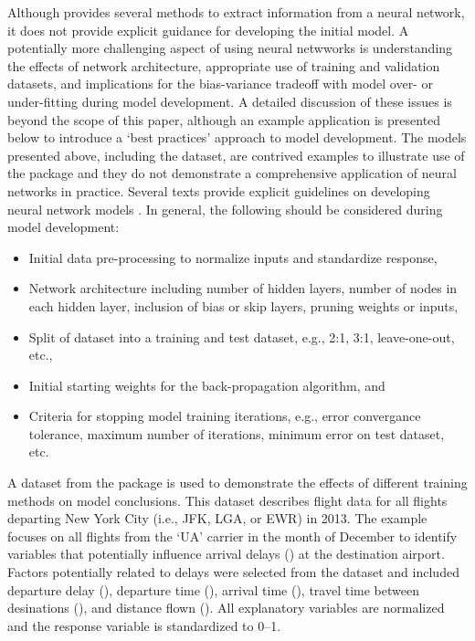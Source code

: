 \documentclass[article,shortnames]{jss}\usepackage[]{graphicx}\usepackage[]{color}
\begin{document}
Although  provides several methods to extract information from a neural network, it does not provide explicit guidance for developing the initial model.  A potentially more challenging aspect of using neural netwworks is understanding the effects of network architecture, appropriate use of training and validation datasets, and implications for the bias-variance tradeoff with model over- or under-fitting during model development.  A detailed discussion of these issues is beyond the scope of this paper, although an example application is presented below to introduce a `best practices' approach to model development.  The models presented above, including the  dataset, are contrived examples to illustrate use of the  package and they do not demonstrate a comprehensive application of neural networks in practice.  Several texts provide explicit guidelines on developing neural network models \cite[e.g.,][]{Ripley96, Lek00, Maier00}.  In general, the following should be considered during model development:
\begin{itemize}
\item Initial data pre-processing to normalize inputs and standardize response,
\item Network architecture including number of hidden layers, number of nodes in each hidden layer, inclusion of bias or skip layers, pruning weights or inputs,
\item Split of dataset into a training and test dataset, e.g., 2:1, 3:1, leave-one-out, etc., 
\item Initial starting weights for the back-propagation algorithm, and
\item Criteria for stopping model training iterations, e.g., error convergance tolerance, maximum number of iterations, minimum error on test dataset, etc.
\end{itemize}

A dataset from the  package \citep{Wickham14b} is used to demonstrate the effects of different training methods on model conclusions.  This dataset describes flight data for all flights departing New York City (i.e., JFK, LGA, or EWR) in 2013.  The example focuses on all flights from the `UA' carrier in the month of December to identify variables that potentially influence arrival delays () at the destination airport.  Factors potentially related to delays were selected from the dataset and included departure delay (), departure time (), arrival time (), travel time between desinations (), and distance flown ().  All explanatory variables are normalized and the response variable is standardized to 0--1.  
\end{document}
